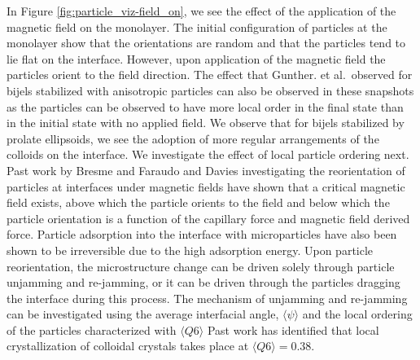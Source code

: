 In Figure \ref{fig:particle_viz-field_on}, we see the effect of the
application of the magnetic field on the monolayer. The initial
configuration of particles at the monolayer show that the orientations
are random and that the particles tend to lie flat on the interface.
However, upon application of the magnetic field the particles orient to
the field direction. The effect that Gunther. et al.~observed for bijels
stabilized with anisotropic particles can also be observed in these
snapshots as the particles can be observed to have more local order in
the final state than in the initial state with no applied field. We
observe that for bijels stabilized by prolate ellipsoids, we see the
adoption of more regular arrangements of the colloids on the interface.
We investigate the effect of local particle ordering next. Past work by
Bresme and Faraudo and Davies investigating the reorientation of
particles at interfaces under magnetic fields have shown that a critical
magnetic field exists, above which the particle orients to the field and
below which the particle orientation is a function of the capillary
force and magnetic field derived force. \cite{davies_interface_2014}
\cite{bresme_orientational_2007} Particle adsorption into the interface
with microparticles have also been shown to be irreversible due to the
high adsorption energy. Upon particle reorientation, the microstructure
change can be driven solely through particle unjamming and re-jamming,
or it can be driven through the particles dragging the interface during
this process. The mechanism of unjamming and re-jamming can be
investigated using the average interfacial angle, $\langle \psi \rangle$
and the local ordering of the particles characterized with 
$\langle Q6 \rangle$ Past work has identified that local crystallization 
of colloidal crystals takes place at \(\langle Q6 \rangle = 0.38\). 
\cite{toxvaerd_role_2020}

